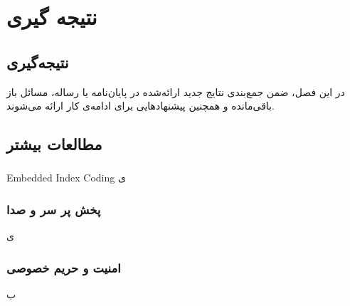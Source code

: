 \chapter{نتیجه گیری}
\section{نتیجه‌گیری}

در این فصل، ضمن جمع‌بندی نتایج جدید ارائه‌شده در پایان‌نامه یا رساله،
مسائل باز باقی‌مانده و همچنین پیشنهادهایی برای ادامه‌ی کار ارائه می‌شوند.
\section{مطالعات بیشتر}

\subsection{
}
Embedded Index Coding
ی
\subsection{پخش پر سر و صدا}
ی
\subsection{ امنیت و حریم خصوصی}
ب
